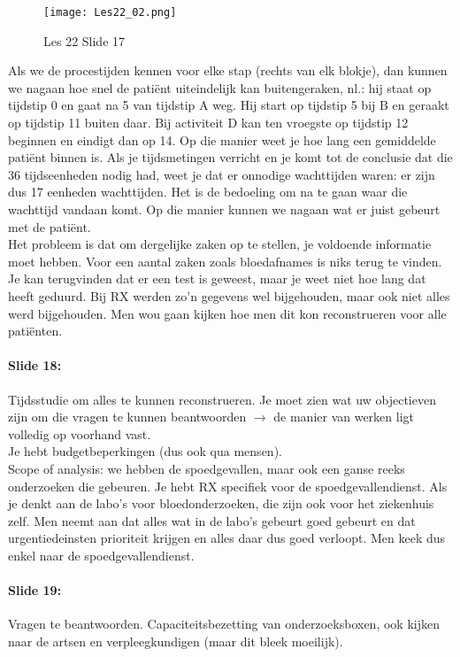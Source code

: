 \documentclass[10pt,a4paper]{report}
\begin{document}
\begin{figure}[h!]
\centering
\texttt{[image: Les22\_02.png]}
\caption{Les 22 Slide 17} 
\label{les22_02}
\end{figure}

Als we de procestijden kennen voor elke stap (rechts van elk blokje), dan kunnen we nagaan hoe snel de pati\"ent uiteindelijk kan buitengeraken, nl.: hij staat op tijdstip 0 en gaat na 5 van tijdstip A weg. Hij start op tijdstip 5 bij B en geraakt op tijdstip 11 buiten daar. Bij activiteit D kan ten vroegste op tijdstip 12 beginnen en eindigt dan op 14. Op die manier weet je hoe lang een gemiddelde pati\"ent binnen is. Als je tijdsmetingen verricht en je komt tot de conclusie dat die 36 tijdseenheden nodig had, weet je dat er onnodige wachttijden waren: er zijn dus 17 eenheden wachttijden. Het is de bedoeling om na te gaan waar die wachttijd vandaan komt. Op die manier kunnen we nagaan wat er juist gebeurt met de pati\"ent.\\
Het probleem is dat om dergelijke zaken op te stellen, je voldoende informatie moet hebben. Voor een aantal zaken zoals bloedafnames is niks terug te vinden. Je kan terugvinden dat er een test is geweest, maar je weet niet hoe lang dat heeft geduurd. Bij RX werden zo'n gegevens wel bijgehouden, maar ook niet alles werd bijgehouden. Men wou gaan kijken hoe men dit kon reconstrueren voor alle pati\"enten.

\paragraph{Slide 18:} Tijdsstudie om alles te kunnen reconstrueren. Je moet zien wat uw objectieven zijn om die vragen te kunnen beantwoorden $\rightarrow$ de manier van werken ligt volledig op voorhand vast. \\
Je hebt budgetbeperkingen (dus ook qua mensen).\\
Scope of analysis: we hebben de spoedgevallen, maar ook een ganse reeks onderzoeken die gebeuren. Je hebt RX specifiek voor de spoedgevallendienst. Als je denkt aan de labo's voor bloedonderzoeken, die zijn ook voor het ziekenhuis zelf. Men neemt aan dat alles wat in de labo's gebeurt goed gebeurt en dat urgentiedeinsten prioriteit krijgen en alles daar dus goed verloopt. Men keek dus enkel naar de spoedgevallendienst.

\paragraph{Slide 19:} Vragen te beantwoorden. Capaciteitsbezetting van onderzoeksboxen, ook kijken naar de artsen en verpleegkundigen (maar dit bleek moeilijk).
\end{document}
